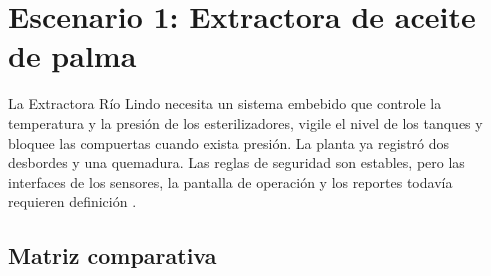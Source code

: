 \documentclass[11pt,a4paper]{article}
\begin{document}
\section{Escenario 1: Extractora de aceite de palma}

La Extractora Río Lindo necesita un sistema embebido que controle la temperatura y la presión de los esterilizadores, vigile el nivel de los tanques y bloquee las compuertas cuando exista presión. La planta ya registró dos desbordes y una quemadura. Las reglas de seguridad son estables, pero las interfaces de los sensores, la pantalla de operación y los reportes todavía requieren definición \cite[sec.~5.1]{materialGA}.

\subsection{Matriz comparativa}
\end{document}
